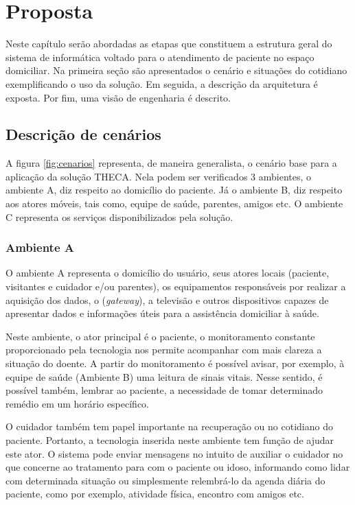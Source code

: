 \chapter{Proposta}\label{cap:proposta}

Neste capítulo serão abordadas as etapas que constituem a estrutura geral do
sistema de informática voltado para o atendimento de paciente no espaço domiciliar. 
Na primeira seção são apresentados o cenário e situações do cotidiano exemplificando
o uso da solução. Em seguida, a descrição da arquitetura é exposta. Por fim, uma
visão de engenharia é descrito.

\section{Descrição de cenários}

A figura \ref{fig:cenarios} representa, de maneira generalista, o cenário base
para a aplicação da solução THECA. Nela podem ser verificados 3 ambientes, o
ambiente A, diz respeito ao domicílio do paciente. Já o ambiente B, diz respeito
aos atores móveis, tais como, equipe de saúde, parentes, amigos etc. O ambiente
C representa os serviços disponibilizados pela solução.


\subsection{Ambiente A} \label{subsec:ambiente-a}

O ambiente A representa o domicílio do usuário, seus atores locais (paciente,
visitantes e cuidador e/ou parentes), os equipamentos responsáveis por  realizar
a aquisição dos dados, o \stb[] (\textit{gateway}), a televisão e outros
dispositivos capazes de apresentar dados e informações úteis para a assistência
domiciliar à saúde.

Neste ambiente, o ator principal é o paciente, o monitoramento constante 
proporcionado pela tecnologia nos permite acompanhar com mais clareza a situação
do doente. A partir do monitoramento é possível avisar, por exemplo, à equipe
de saúde (Ambiente B) uma leitura de sinais vitais. Nesse sentido, é possível 
também, lembrar ao paciente, a necessidade de tomar determinado remédio em um
horário específico.

O cuidador também tem papel importante na recuperação ou no cotidiano do 
paciente. Portanto, a tecnologia inserida neste ambiente tem função de ajudar
este ator. O sistema pode enviar mensagens no intuito de auxiliar o cuidador no
que concerne ao tratamento para com o paciente ou idoso, informando como lidar
com determinada situação ou simplesmente relembrá-lo da agenda diária do 
paciente, como por exemplo, atividade física, encontro com amigos etc.

